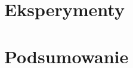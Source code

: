 \documentclass{article}
\begin{document}
\section{Eksperymenty}


\clearpage

\section{Podsumowanie}


\clearpage




\end{document}
